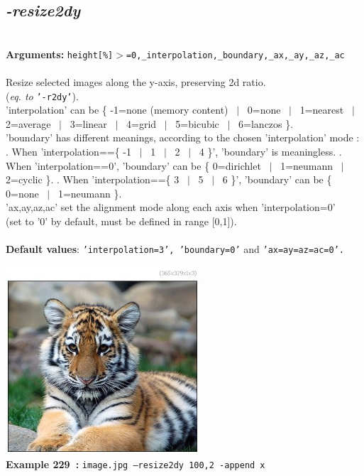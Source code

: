 \documentclass[a4paper,11pt,twoside]{book}
\begin{document}
\subsection{\emph{-resize2dy} }\vspace*{-0.5em}
~\\\textbf{Arguments: } 
{\small \texttt{height[\%]$>$=0,\_interpolation,\_boundary,\_ax,\_ay,\_az,\_ac}}\\~\\
Resize selected images along the y-axis, preserving 2d ratio.
~\\(\emph{eq. to} {\small \texttt{'-r2dy'}}).
~\\'interpolation' can be \{ -1=none (memory content) ~$|$~ 0=none ~$|$~ 1=nearest ~$|$~ 2=average ~$|$~ 3=linear ~$|$~ 4=grid ~$|$~ 5=bicubic ~$|$~ 6=lanczos \}.
~\\'boundary' has different meanings, according to the chosen 'interpolation' mode :
. When 'interpolation==\{ -1 ~$|$~ 1 ~$|$~ 2 ~$|$~ 4 \}', 'boundary' is meaningless.
. When 'interpolation==0', 'boundary' can be \{ 0=dirichlet ~$|$~ 1=neumann ~$|$~ 2=cyclic \}.
. When 'interpolation==\{ 3 ~$|$~ 5 ~$|$~ 6 \}', 'boundary' can be \{ 0=none ~$|$~ 1=neumann \}.
~\\'ax,ay,az,ac' set the alignment mode along each axis when 'interpolation=0'
~\\(set to '0' by default, must be defined in range [0,1]).
~\\~\\\textbf{Default values}: {\small \texttt{'interpolation=3', 'boundary=0'} and \texttt{'ax=ay=az=ac=0'.}}
\begin{center}\includegraphics[keepaspectratio=true,height=7cm,width=\textwidth]{img/gmic_def229.jpg}\\
{\footnotesize \textbf{Example 229~:} \texttt{image.jpg --resize2dy 100,2 -append x}}
\end{center}
\end{document}
